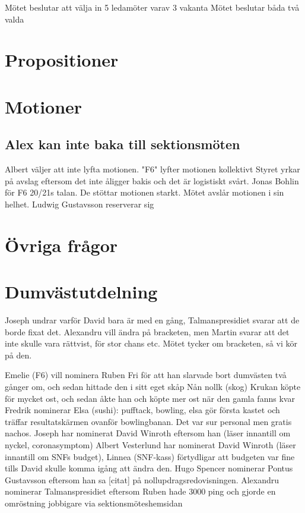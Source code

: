 \documentclass[hidelinks]{sektionsmote}
\begin{document}
Mötet beslutar att välja in 5 ledamöter varav 3 vakanta
Mötet beslutar båda två valda

\section{Propositioner}

\section{Motioner}

\subsection{Alex kan inte baka till sektionsmöten}
Albert väljer att inte lyfta motionen.
"F6" lyfter motionen kollektivt
Styret yrkar på avslag eftersom det inte åligger bakis och det är logistiskt svårt.
Jonas Bohlin för F6 20/21s talan. De stöttar motionen starkt.
Mötet avslår motionen i sin helhet.
Ludwig Gustavsson reserverar sig

\section{Övriga frågor}

\section{Dumvästutdelning}
Joseph undrar varför David bara är med en gång, Talmanspresidiet svarar att de borde fixat det.
Alexandru vill ändra på bracketen, men Martin svarar att det inte skulle vara rättvist, för stor chans etc.
Mötet tycker om bracketen, så vi kör på den.

Emelie (F6) vill nominera Ruben Fri för att han slarvade bort dumvästen två gånger om, och sedan hittade den i sitt eget skåp
Nån nollk (skog) Krukan köpte för mycket ost, och sedan åkte han och köpte mer ost när den gamla fanns kvar
Fredrik nominerar Elsa (sushi): pufftack, bowling, elsa gör första kastet och träffar resultatskärmen ovanför bowlingbanan. Det var sur personal men gratis nachos.
Joseph har nominerat David Winroth eftersom han (läser innantill om nyckel, coronasymptom)
Albert Vesterlund har nominerat David Winroth (läser innantill om SNFs budget), Linnea (SNF-kass) förtydligar att budgeten var fine tills David skulle komma igång att ändra den.
Hugo Spencer nominerar Pontus Gustavsson eftersom han sa [citat] på nollupdragsredovisningen.
Alexandru nominerar Talmanspresidiet eftersom Ruben hade 3000 ping och gjorde en omröstning jobbigare via sektionsmöteshemsidan
\end{document}
